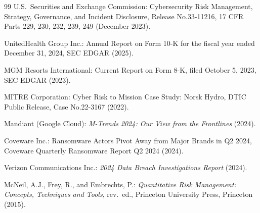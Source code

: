 \documentclass{ipsjlike}
\begin{document}
\begin{thebibliography}{99}
U.S.\ Securities and Exchange Commission:
Cybersecurity Risk Management, Strategy, Governance, and Incident Disclosure,
Release No.33-11216, 17 CFR Parts 229, 230, 232, 239, 249 (December 2023).

UnitedHealth Group Inc.:
Annual Report on Form 10-K for the fiscal year ended December 31, 2024,
SEC EDGAR (2025).

MGM Resorts International:
Current Report on Form 8-K, filed October 5, 2023, SEC EDGAR (2023).

MITRE Corporation:
Cyber Risk to Mission Case Study: Norsk Hydro,
DTIC Public Release, Case No.22-3167 (2022).

Mandiant (Google Cloud):
\textit{M-Trends 2024: Our View from the Frontlines} (2024).

Coveware Inc.:
Ransomware Actors Pivot Away from Major Brands in Q2 2024,
Coveware Quarterly Ransomware Report Q2 2024 (2024).

Verizon Communications Inc.:
\textit{2024 Data Breach Investigations Report} (2024).

McNeil, A.J., Frey, R., and Embrechts, P.:
\textit{Quantitative Risk Management: Concepts, Techniques and Tools},
rev.\ ed., Princeton University Press, Princeton (2015).

\end{thebibliography}
\end{document}
